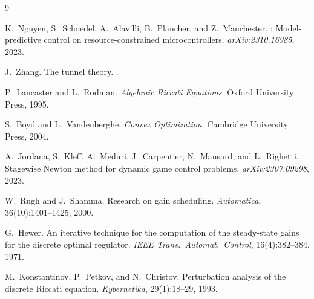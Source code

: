 \documentclass[11pt]{article}
\begin{document}
\begin{thebibliography}{9}

K.~Nguyen, S.~Schoedel, A.~Alavilli, B.~Plancher,
and Z.~Manchester.
: Model-predictive control on
  resource-constrained microcontrollers.
\newblock \emph{arXiv:2310.16985}, 2023.

J.~Zhang.
\newblock The tunnel theory.
.

P.~Lancaster and L.~Rodman.
\newblock \emph{Algebraic Riccati Equations}.
\newblock Oxford University Press, 1995.

S.~Boyd and L.~Vandenberghe.
\newblock \emph{Convex Optimization}.
\newblock Cambridge University Press, 2004.

A.~Jordana, S.~Kleff, A.~Meduri, J.~Carpentier,
N.~Mansard, and L.~Righetti.
\newblock Stagewise {N}ewton method for dynamic game
  control problems.
\newblock \emph{arXiv:2307.09298}, 2023.

W.~Rugh and J.~Shamma.
\newblock Research on gain scheduling.
\newblock \emph{Automatica}, 36(10):1401--1425, 2000.

G.~Hewer.
\newblock An iterative technique for the computation
  of the steady-state gains for the discrete optimal
  regulator.
\newblock \emph{IEEE Trans.\ Automat.\ Control},
  16(4):382--384, 1971.

M.~Konstantinov, P.~Petkov, and N.~Christov.
\newblock Perturbation analysis of the discrete
  Riccati equation.
\newblock \emph{Kybernetika}, 29(1):18--29, 1993.

\end{thebibliography}
\end{document}
